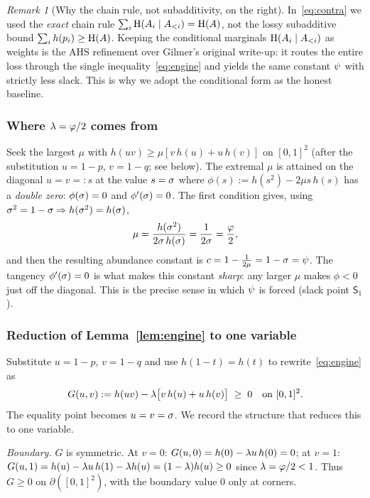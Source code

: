 \documentclass[11pt]{amsart}
\theoremstyle{definition}
\theoremstyle{remark}
\newtheorem{remark}[theorem]{Remark}
\begin{document}
\begin{remark}[Why the chain rule, not subadditivity, on the right]
In~\eqref{eq:contra} we used the \emph{exact} chain rule
$\sum_i\operatorname{H}(A_i\mid A_{<i})=\operatorname{H}(A)$, not the lossy subadditive bound
$\sum_i h(p_i)\ge\operatorname{H}(A)$. Keeping the conditional marginals $\operatorname{H}(A_i\mid A_{<i})$
as weights is the AHS refinement over Gilmer's original write-up: it routes the
entire loss through the single inequality~\eqref{eq:engine} and yields the same
constant $\psi$ with strictly less slack. This is why we adopt the conditional
form as the honest baseline.
\end{remark}

\subsubsection*{Where $\lambda=\varphi/2$ comes from}
Seek the largest $\mu$ with $h(uv)\ge\mu[v\,h(u)+u\,h(v)]$ on $[0,1]^2$ (after the
substitution $u=1-p$, $v=1-q$; see below). The extremal $\mu$ is attained on the
diagonal $u=v=:s$ at the value $s=\sigma$ where
$\phi(s):=h(s^2)-2\mu s\,h(s)$ has a \emph{double zero}: $\phi(\sigma)=0$ and
$\phi'(\sigma)=0$. The first condition gives, using
$\sigma^2=1-\sigma\Rightarrow h(\sigma^2)=h(\sigma)$,
\[
   \mu=\frac{h(\sigma^2)}{2\sigma\,h(\sigma)}=\frac{1}{2\sigma}=\frac{\varphi}{2},
\]
and then the resulting abundance constant is $c=1-\tfrac1{2\mu}=1-\sigma=\psi$.
The tangency $\phi'(\sigma)=0$ is what makes this constant \emph{sharp}: any larger
$\mu$ makes $\phi<0$ just off the diagonal. This is the precise sense in which
$\psi$ is forced (slack point $\mathsf S_1$).

\subsubsection*{Reduction of Lemma~\ref{lem:engine} to one variable}
Substitute $u=1-p$, $v=1-q$ and use $h(1-t)=h(t)$ to rewrite~\eqref{eq:engine} as
\begin{equation}\label{eq:G}
   G(u,v):=h(uv)-\lambda\bigl[v\,h(u)+u\,h(v)\bigr]\;\ge\;0\quad\text{on }[0,1]^2 .
\end{equation}
The equality point becomes $u=v=\sigma$. We record the structure that reduces this
to one variable.

\emph{Boundary.} $G$ is symmetric. At $v=0$: $G(u,0)=h(0)-\lambda u\,h(0)=0$; at
$v=1$: $G(u,1)=h(u)-\lambda u\,h(1)-\lambda h(u)=(1-\lambda)h(u)\ge 0$ since
$\lambda=\varphi/2<1$. Thus $G\ge 0$ on $\partial([0,1]^2)$, with the boundary value
$0$ only at corners.
\end{document}
